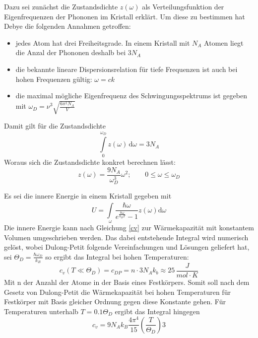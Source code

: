 \documentclass{include/thesisclass3}
\newcommand{\dd}{\text{d}}
\newcommand{\e}[1]{\,\si{#1}}
\begin{document}
Dazu sei zunächst die Zustandsdichte $z(\omega)$ als Verteilungsfunktion der Eigenfrequenzen der Phononen im Kristall erklärt.
Um diese zu bestimmen hat Debye die folgenden Annahmen getroffen:
\begin{itemize}
\item jedes Atom hat drei Freiheitsgrade. In einem Kristall mit $N_A$ Atomen liegt die Anzal der Phononen deshalb bei $3N_A$\\
\item die bekannte lineare Dispersionsrelation für tiefe Frequenzen ist auch bei hohen Frequenzen gültig: $\omega = c k$\\
\item die maximal mögliche Eigenfrequenz des Schwingungsspektrums ist gegeben mit $\omega_D=\nu^3\sqrt{\frac{6 \pi ^2 N_A}{V}}$
\end{itemize}
Damit gilt für die Zustandsdichte
\begin{equation}
\int \limits_{0}^{\omega_D} \! z(\omega) \, \dd\omega = 3N_A
\end{equation}
Woraus sich die Zustandsdichte konkret berechnen lässt:
\begin{equation}
z(\omega)= \frac{9N_A}{\omega_D^3}\omega^2;\qquad 0\leq  \omega \leq \omega_D
\end{equation}

Es sei die innere Energie in einem Kristall gegeben mit
\begin{equation}
U= \int \limits_{\omega}^{}\! \frac{\hbar \omega}{e^{\frac{\hbar \omega}{k_B T}}-1} z(\omega)\dd \omega
\end{equation}
Die innere Energie kann nach Gleichung \ref{cv} zur Wärmekapazität mit konstantem Volumen umgeschrieben werden. Das dabei entstehende Integral wird numerisch gelöst, wobei Dulong-Petit  folgende Vereinfachungen und Lösungen geliefert hat, sei $\Theta_D=\frac{\hbar \omega_D}{k_B}$ so ergibt das Integral bei hohen Temperaturen:
\begin{equation}
c_v(T\ll\Theta_D)=c_{DP}=n\cdot 3N_Ak_b\approx 25\e{\frac{J}{mol\cdot K}}
\end{equation}
Mit n der Anzahl der Atome in der Basis eines Festkörpers.
Somit soll nach dem Gesetz von Dulong-Petit die Wärmekapazität bei hohen Temperaturen für Festkörper mit  Basis gleicher Ordnung gegen diese Konstante gehen. Für Temperaturen unterhalb $T=0.1\Theta_D$ ergibt das Integral hingegen
\begin{equation}
c_v=9N_Ak_B\frac{4\pi^4}{15}\left(\frac{T}{\Theta_D} \right)3
\end{equation}
\end{document}
